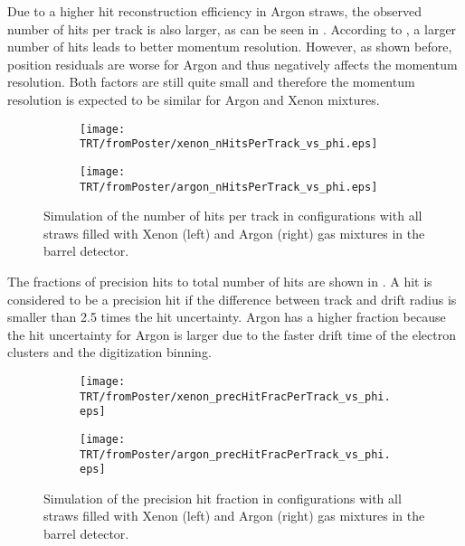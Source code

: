 
Due to a higher hit reconstruction efficiency in Argon straws, the observed number of hits per track is also larger, as can be seen in . 
According to , a larger number of hits leads to better momentum resolution. However, as shown before, position residuals are
worse for Argon and thus negatively affects the momentum resolution. Both factors are still quite small and therefore the momentum resolution is expected to be similar for
Argon and Xenon mixtures.

\begin{figure}

\begin{subfigure}{.5\textwidth}
  \centering
  \texttt{[image: TRT/fromPoster/xenon\_nHitsPerTrack\_vs\_phi.eps]}
\end{subfigure}%
\begin{subfigure}{.5\textwidth}
  \centering
  \texttt{[image: TRT/fromPoster/argon\_nHitsPerTrack\_vs\_phi.eps]}
\end{subfigure}

\caption{Simulation of the number of hits per track in configurations with all straws filled with Xenon (left) and Argon (right) gas mixtures in the barrel detector.}
  \label{fig:nHitsPerTrack}
\end{figure}

The fractions of precision hits to total number of hits are shown in . A hit is considered to be a precision
hit if the difference between track and drift radius is smaller than 2.5 times the hit uncertainty. Argon has a higher fraction because the hit uncertainty
for Argon is larger due to the faster drift time of the electron clusters and the digitization binning. 

\begin{figure}

\begin{subfigure}{.5\textwidth}
  \centering
  \texttt{[image: TRT/fromPoster/xenon\_precHitFracPerTrack\_vs\_phi.eps]}
\end{subfigure}%
\begin{subfigure}{.5\textwidth}
  \centering
  \texttt{[image: TRT/fromPoster/argon\_precHitFracPerTrack\_vs\_phi.eps]}
\end{subfigure}

\caption{Simulation of the precision hit fraction in configurations with all straws filled with Xenon (left) and Argon (right) gas mixtures in the barrel detector.}
  \label{fig:precHitFracPerTrack}
\end{figure}

